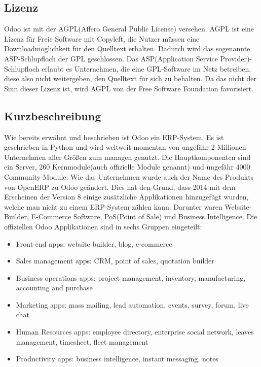 \subsection{Lizenz}
Odoo ist mit der AGPL(Affero General Public License) versehen. AGPL ist eine Lizenz für Freie Software mit Copyleft, die Nutzer müssen eine Downloadmöglichkeit für den Quelltext erhalten. Dadurch wird das sogenannte ASP-Schlupfloch der GPL geschlossen. Das ASP(Application Service Provider)-Schlupfloch erlaubt es Unternehmen, die eine GPL-Software im Netz betreiben, diese also nicht weitergeben, den Quelltext für sich zu behalten. Da das nicht der Sinn dieser Lizenz ist, wird AGPL von der Free Software Foundation favorisiert.

\subsection{Kurzbeschreibung}
Wie bereits erwähnt und beschrieben ist Odoo ein ERP-System. Es ist geschrieben in Python und wird weltweit momentan von ungefähr 2 Millionen Unternehmen aller Größen zum managen genutzt.
Die Hauptkomponenten sind ein Server, 260 Kernmodule(auch offizielle Module genannt) und ungefähr 4000 Community-Module.
Wie das Unternehmen wurde auch der Name des Produkts von OpenERP zu Odoo geändert. Dies hat den Grund, dass 2014 mit dem Erscheinen der Version 8 einige zusätzliche Applikationen hinzugefügt wurden, welche man nicht zu einem ERP-System zählen kann. Darunter waren Website-Builder, E-Commerce Software, PoS(Point of Sale) und Business Intelligence.
Die offiziellen Odoo Applikationen sind in sechs Gruppen eingeteilt:

\begin{itemize}
	\item Front-end apps: website builder, blog, e-commerce
	\item Sales management apps: CRM, point of sales, quotation builder
	\item Business operations apps: project management, inventory, manufacturing, accounting and purchase
	\item Marketing apps: mass mailing, lead automation, events, survey, forum, live chat
	\item Human Resources apps: employee directory, enterprise social network, leaves management, timesheet, fleet management
	\item Productivity apps: business intelligence, instant messaging, notes
\end{itemize}

